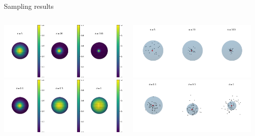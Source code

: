 \begin{frame}{Sampling results}
  \centering
  \begin{columns}
    \begin{column}{.5\textwidth}
      \centering
      \includegraphics[width=\textwidth]{figures/vMF_density.png}
      \vfill
      \includegraphics[width=\textwidth]{figures/normal_density.png}
    \end{column}
    \begin{column}{.5\textwidth}
      \centering
      \includegraphics[width=\textwidth]{figures/vMF_sampling_ours.png}
      \vfill
      \includegraphics[width=\textwidth]{figures/normal_sampling.png}
    \end{column}
  \end{columns}
\end{frame}